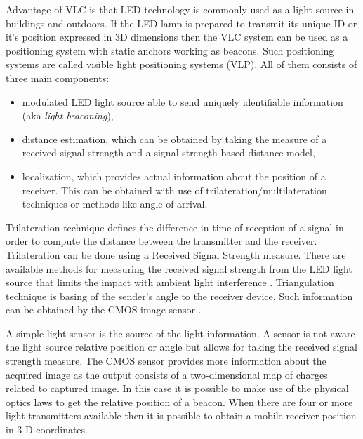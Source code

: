 \documentclass[../main.tex]{subfiles}
\begin{document}
Advantage of VLC is that LED technology is commonly used as a light source in buildings and outdoors. If the LED lamp is prepared to transmit its unique ID or it's position expressed in 3D dimensions then the VLC system can be used as a positioning system with static anchors working as beacons. Such positioning systems are called visible light positioning systems (VLP). All of them consists of three main components:
\begin{itemize}
	\item modulated LED light source able to send uniquely identifiable information (aka \textit{light beaconing}\cite{visible_light_positioning_epsilon}),
	\item distance estimation, which can be obtained by taking the measure of a received signal strength and a signal strength based distance model,
	\item localization, which provides actual information about the position of a receiver. This can be obtained with use of trilateration/multilateration techniques\cite{visible_light_positioning_epsilon} or methods like angle of arrival\cite{visible_light_positioning}.
\end{itemize}

Trilateration technique defines the difference in time of reception of a signal in order to compute the distance between the transmitter and the receiver. Trilateration can be done using a Received Signal Strength measure. There are available methods for measuring the received signal strength from the LED light source that limits the impact with ambient light interference \cite{visible_light_positioning_epsilon}. Triangulation technique is basing of the sender's angle to the receiver device. Such information can be obtained by the CMOS image sensor \cite{visible_light_positioning}.

A simple light sensor is the source of the light information. A sensor is not aware the light source relative position or angle but allows for taking the received signal strength measure. The CMOS sensor provides more information about the acquired image as the output consists of a two-dimensional map of charges related to captured image. In this case it is possible to make use of the physical optics laws to get the relative position of a beacon. When there are four or more light transmitters available then it is possible to obtain a mobile receiver position in 3-D coordinates.
\end{document}
